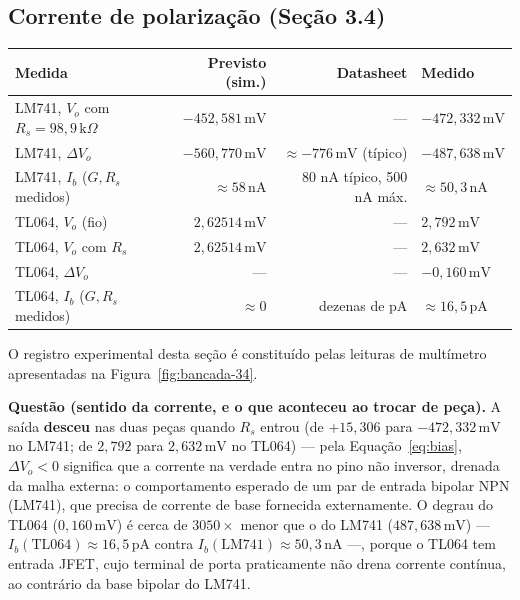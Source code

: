 \documentclass[11pt,a4paper]{article}
\begin{document}
\subsection{Corrente de polarização (Seção 3.4)}

\begin{center}\small
\setlength{\tabcolsep}{4pt}
\begin{tabular}{@{}lrrl@{}}
\toprule
\textbf{Medida} & \textbf{Previsto (sim.)} & \textbf{Datasheet} & \textbf{Medido} \\
\midrule
LM741, \(V_o\) com \(R_s{=}98{,}9\,\text{k}\Omega\) & \(-452{,}581\,\text{mV}\) & — & \(-472{,}332\,\text{mV}\) \\
LM741, \(\Delta V_o\) & \(-560{,}770\,\text{mV}\) & \({\approx}{-}776\,\text{mV}\) (típico) & \(-487{,}638\,\text{mV}\) \\
LM741, \(I_b\) (\(G,R_s\) medidos) & \({\approx}58\,\text{nA}\) & 80 nA típico, 500 nA máx. & \({\approx}50{,}3\,\text{nA}\) \\
TL064, \(V_o\) (fio) & \(2{,}62514\,\text{mV}\) & — & \(2{,}792\,\text{mV}\) \\
TL064, \(V_o\) com \(R_s\) & \(2{,}62514\,\text{mV}\) & — & \(2{,}632\,\text{mV}\) \\
TL064, \(\Delta V_o\) & — & — & \(-0{,}160\,\text{mV}\) \\
TL064, \(I_b\) (\(G,R_s\) medidos) & \({\approx}0\) & dezenas de pA & \({\approx}16{,}5\,\text{pA}\) \\
\bottomrule
\end{tabular}
\end{center}

O registro experimental desta seção é constituído pelas leituras de multímetro
apresentadas na Figura~\ref{fig:bancada-34}.

\textbf{Questão (sentido da corrente, e o que aconteceu ao trocar de peça).} A saída
\textbf{desceu} nas duas peças quando \(R_s\) entrou (de \(+15{,}306\) para
\(-472{,}332\,\text{mV}\) no LM741; de \(2{,}792\) para \(2{,}632\,\text{mV}\) no TL064) — pela
Equação~\eqref{eq:bias}, \(\Delta V_o<0\) significa que a corrente na verdade entra no pino não
inversor, drenada da malha externa: o comportamento esperado de um par de entrada bipolar NPN
(LM741), que precisa de corrente de base fornecida externamente. O degrau do TL064
(\(0{,}160\,\text{mV}\)) é cerca de \(3050\times\) menor que o do LM741
(\(487{,}638\,\text{mV}\)) — \(I_b(\text{TL064}){\approx}16{,}5\,\text{pA}\) contra
\(I_b(\text{LM741}){\approx}50{,}3\,\text{nA}\) —, porque o TL064 tem entrada JFET, cujo terminal
de porta praticamente não drena corrente contínua, ao contrário da base bipolar do LM741.
\end{document}
